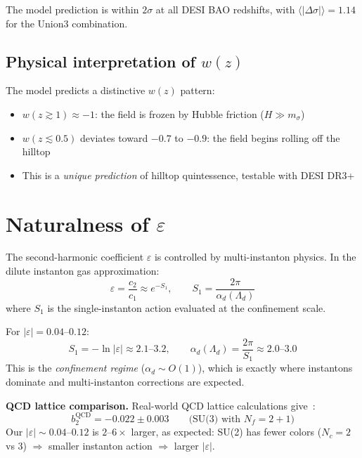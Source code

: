\documentclass[11pt,a4paper]{article}
\newcommand{\Ld}{\Lambda_d}
\begin{document}
The model prediction is within $2\sigma$ at all DESI BAO redshifts, with 
$\langle|\Delta\sigma|\rangle = 1.14$ for the Union3 combination.

\subsection{Physical interpretation of $w(z)$}

The model predicts a distinctive $w(z)$ pattern:
\begin{itemize}[nosep]
  \item $w(z \gtrsim 1) \approx -1$: the field is frozen by Hubble friction ($H \gg m_\sigma$)
  \item $w(z \lesssim 0.5)$ deviates toward $-0.7$ to $-0.9$: the field begins rolling off the hilltop
  \item This is a \emph{unique prediction} of hilltop quintessence, testable with DESI DR3+
\end{itemize}

\section{Naturalness of $\varepsilon$}
\label{sec:naturalness}

The second-harmonic coefficient $\varepsilon$ is controlled by multi-instanton physics.
In the dilute instanton gas approximation:
\begin{equation}
  \varepsilon = \frac{c_2}{c_1} \approx e^{-S_1}, \qquad S_1 = \frac{2\pi}{\alpha_d(\Ld)}
\end{equation}
where $S_1$ is the single-instanton action evaluated at the confinement scale.

For $|\varepsilon| = 0.04$--$0.12$:
\begin{equation}
  S_1 = -\ln|\varepsilon| \approx 2.1\text{--}3.2, \qquad 
  \alpha_d(\Ld) = \frac{2\pi}{S_1} \approx 2.0\text{--}3.0
\end{equation}
This is the \emph{confinement regime} ($\alpha_d \sim O(1)$), which is exactly where 
instantons dominate and multi-instanton corrections are expected.

\medskip
\noindent
\textbf{QCD lattice comparison.} Real-world QCD lattice calculations give~\cite{Bonati2015,Borsanyi2016}:
\begin{equation}
  b_2^\mathrm{QCD} = -0.022 \pm 0.003 \qquad \text{(SU(3) with $N_f = 2+1$)}
\end{equation}
Our $|\varepsilon| \sim 0.04$--$0.12$ is $2$--$6\times$ larger, as expected:
SU(2) has fewer colors ($N_c = 2$ vs 3) $\Rightarrow$ smaller instanton action $\Rightarrow$ larger $|\varepsilon|$.
\end{document}

